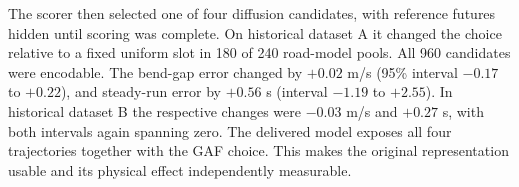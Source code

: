 The scorer then selected one of four diffusion candidates, with reference futures hidden until scoring was complete. On historical dataset A it changed the choice relative to a fixed uniform slot in 180 of 240 road-model pools. All 960 candidates were encodable. The bend-gap error changed by $+0.02$ m/s (95\% interval $-0.17$ to $+0.22$), and steady-run error by $+0.56$ s (interval $-1.19$ to $+2.55$). In historical dataset B the respective changes were $-0.03$ m/s and $+0.27$ s, with both intervals again spanning zero. The delivered model exposes all four trajectories together with the GAF choice. This makes the original representation usable and its physical effect independently measurable.
